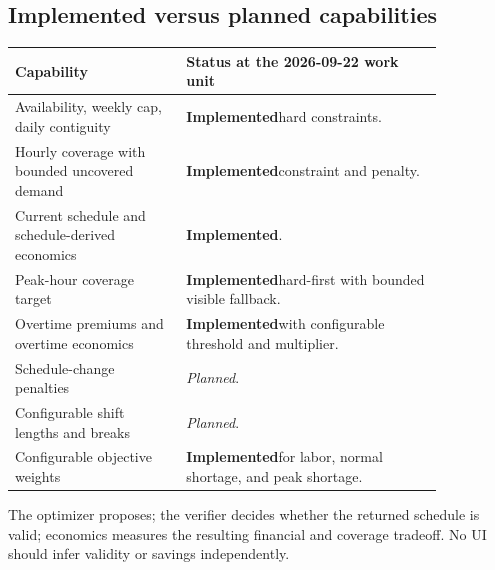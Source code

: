 \documentclass[11pt,a4paper]{article}
\newcommand{\planned}{\textit{Planned}}
\newcommand{\implemented}{\textbf{Implemented}}
\begin{document}
\subsection{Implemented versus planned capabilities}
\begin{tabular}{p{0.34\linewidth}p{0.51\linewidth}}
\toprule
Capability & Status at the 2026-09-22 work unit\\
\midrule
Availability, weekly cap, daily contiguity & \implemented hard constraints.\\
Hourly coverage with bounded uncovered demand & \implemented constraint and penalty.\\
Current schedule and schedule-derived economics & \implemented.\\
Peak-hour coverage target & \implemented hard-first with bounded visible fallback.\\
Overtime premiums and overtime economics & \implemented with configurable threshold and multiplier.\\
Schedule-change penalties & \planned.\\
Configurable shift lengths and breaks & \planned.\\
Configurable objective weights & \implemented for labor, normal shortage, and peak shortage.\\
\bottomrule
\end{tabular}

The optimizer proposes; the verifier decides whether the returned schedule is valid; economics measures the resulting financial and coverage tradeoff. No UI should infer validity or savings independently.
\end{document}
